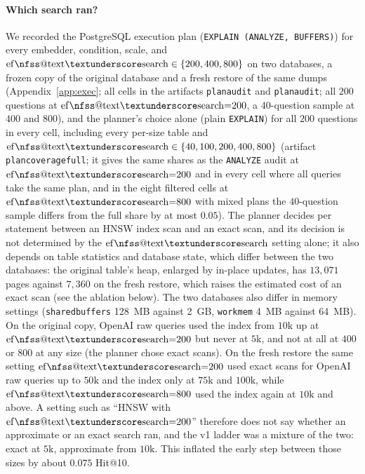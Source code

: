 \documentclass{ieeeaccess}
\makeatletter
\DeclareRobustCommand{\_}{\ifmmode\nfss@text{\textunderscore}\else\textunderscore\allowbreak\fi}
\makeatother
\begin{document}
\paragraph{Which search ran?}
We recorded the PostgreSQL execution plan (\texttt{EXPLAIN (ANALYZE, BUFFERS)}) for every embedder, condition, scale, and $\mathrm{ef\_search}\in\{200,400,800\}$ on two databases, a frozen copy of the original database and a fresh restore of the same dumps (Appendix~\ref{app:exec}; all cells in the artifacts \texttt{plan\_audit\_5433} and \texttt{plan\_audit\_5434}; all $200$ questions at $\mathrm{ef\_search}{=}200$, a $40$-question sample at $400$ and $800$), and the planner's choice alone (plain \texttt{EXPLAIN}) for all $200$ questions in every cell, including every per-size table and $\mathrm{ef\_search}\in\{40,100,200,400,800\}$ (artifact \texttt{plan\_coverage\_full}; it gives the same shares as the \texttt{ANALYZE} audit at $\mathrm{ef\_search}{=}200$ and in every cell where all queries take the same plan, and in the eight filtered cells at $\mathrm{ef\_search}{=}800$ with mixed plans the $40$-question sample differs from the full share by at most $0.05$). The planner decides per statement between an HNSW index scan and an exact scan, and its decision is not determined by the $\mathrm{ef\_search}$ setting alone; it also depends on table statistics and database state, which differ between the two databases: the original table's heap, enlarged by in-place updates, has $13{,}071$ pages against $7{,}360$ on the fresh restore, which raises the estimated cost of an exact scan (see the ablation below). The two databases also differ in memory settings (\texttt{shared\_buffers} 128~MB against 2~GB, \texttt{work\_mem} 4~MB against 64~MB). On the original copy, OpenAI raw queries used the index from $10\text{k}$ up at $\mathrm{ef\_search}{=}200$ but never at $5\text{k}$, and not at all at $400$ or $800$ at any size (the planner chose exact scans). On the fresh restore the same setting $\mathrm{ef\_search}{=}200$ used exact scans for OpenAI raw queries up to $50\text{k}$ and the index only at $75\text{k}$ and $100\text{k}$, while $\mathrm{ef\_search}{=}800$ used the index again at $10\text{k}$ and above. A setting such as ``HNSW with $\mathrm{ef\_search}{=}200$'' therefore does not say whether an approximate or an exact search ran, and the v1 ladder was a mixture of the two: exact at $5\text{k}$, approximate from $10\text{k}$. This inflated the early step between those sizes by about $0.075$ Hit@10.
\end{document}
